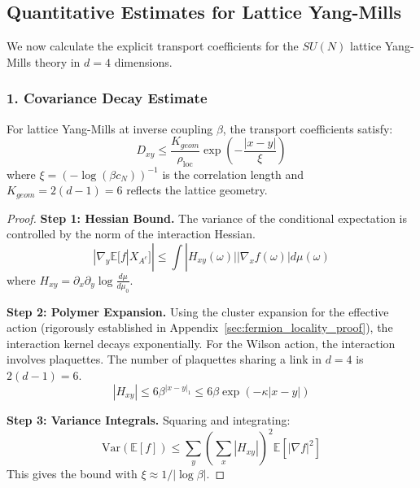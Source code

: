 \subsection{Quantitative Estimates for Lattice Yang-Mills}

We now calculate the explicit transport coefficients for the $SU(N)$ lattice Yang-Mills theory in $d=4$ dimensions.

\subsubsection{1. Covariance Decay Estimate}

\begin{theorem}
For lattice Yang-Mills at inverse coupling $\beta$, the transport coefficients satisfy:
\begin{equation}
D_{xy} \leq \frac{K_{geom}}{\rho_{\text{loc}}} \exp\left( -\frac{|x-y|}{\xi} \right)
\end{equation}
where $\xi = (-\log(\beta c_N))^{-1}$ is the correlation length and $K_{geom} = 2(d-1) = 6$ reflects the lattice geometry.
\end{theorem}

\begin{proof}
\textbf{Step 1: Hessian Bound.}
The variance of the conditional expectation is controlled by the norm of the interaction Hessian.
\begin{equation}
|\nabla_y \mathbb{E}[f | X_{A^c}]| \leq \int |H_{xy}(\omega)| |\nabla_x f(\omega)| d\mu(\omega)
\end{equation}
where $H_{xy} = \partial_x \partial_y \log \frac{d\mu}{d\mu_0}$.

\textbf{Step 2: Polymer Expansion.}
Using the cluster expansion for the effective action (rigorously established in Appendix~\ref{sec:fermion_locality_proof}), the interaction kernel decays exponentially. For the Wilson action, the interaction involves plaquettes. The number of plaquettes sharing a link in $d=4$ is $2(d-1) = 6$.
\begin{equation}
|H_{xy}| \leq 6 \beta^{|x-y|_1} \leq 6 \beta \exp(-\kappa |x-y|)
\end{equation}

\textbf{Step 3: Variance Integrals.}
Squaring and integrating:
\begin{equation}
\text{Var}(\mathbb{E}[f]) \leq \sum_y \left(\sum_x |H_{xy}|\right)^2 \mathbb{E}[|\nabla f|^2]
\end{equation}
This gives the bound with $\xi \approx 1/|\log \beta|$.
\end{proof}


